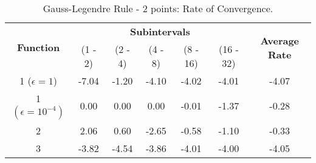 \begin{table}[H]
    \centering
    \caption{Gauss-Legendre Rule - 2 points: Rate of Convergence.}
    \label{tab:gauss2_rate}
    \begin{tabular}{ccccccc}
        \hline
        \multirow{2}{*}{\textbf{Function}} & \multicolumn{5}{c}{\textbf{Subintervals}} & \multicolumn{1}{c}{\multirow{2}{*}{\textbf{Average Rate}}} \\ \cline{2-6}
 & (1 - 2) & (2 - 4) & (4 - 8) & (8 - 16) & (16 - 32) & \multicolumn{1}{c}{} \\ \hline
        \makecell{1 \\ ($\epsilon = 1$)} & -7.04 & -1.20 & -4.10 & -4.02 & -4.01 & -4.07 \\
        \makecell{1 \\ $\left(\epsilon = 10^{-4}\right)$} & 0.00 & 0.00 & 0.00 & -0.01 & -1.37 & -0.28 \\
        2 & 2.06 & 0.60 & -2.65 & -0.58 & -1.10 & -0.33 \\ 
        3 & -3.82 & -4.54 & -3.86 & -4.01 & -4.00 & -4.05 \\ \hline
    \end{tabular}
\end{table}

